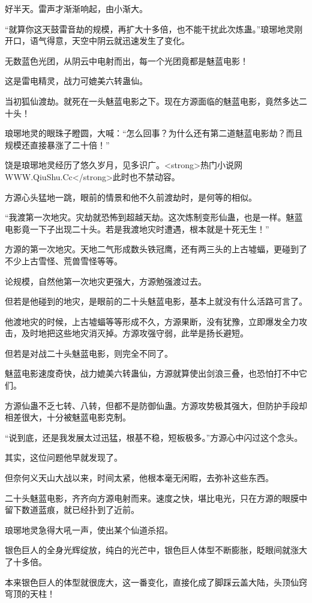 \begin{this_body}
好半天。雷声才渐渐响起，由小渐大。

“就算你这天鼓雷音劫的规模，再扩大十多倍，也不能干扰此次炼蛊。”琅琊地灵刚开口，语气得意，天空中阴云就迅速发生了变化。

无数蓝色光团，从阴云中电射而出，每一个光团竟都是魅蓝电影！

这是雷电精灵，战力可媲美六转蛊仙。

当初狐仙渡劫。就死在一头魅蓝电影之下。现在方源面临的魅蓝电影，竟然多达二十头！

琅琊地灵的眼珠子瞪圆，大喊：“怎么回事？为什么还有第二道魅蓝电影劫？而且规模还直接暴涨了二十倍！”

饶是琅琊地灵经历了悠久岁月，见多识广。<strong>热门小说网WWW.QiuShu.Cc</strong>此时也不禁动容。

方源心头猛地一跳，眼前的情景和他不久前渡劫时，是何等的相似。

“我渡第一次地灾。灾劫就恐怖到超越天劫。这次炼制变形仙蛊，也是一样。魅蓝电影竟一下子出现二十头。若是我渡地灾时遭遇，根本就是十死无生！”

方源的第一次地灾。天地二气形成数头铁冠鹰，还有两三头的上古墟蝠，更碰到了不少上古雪怪、荒兽雪怪等等。

论规模，自然他第一次地灾更强大，方源勉强渡过去。

但若是他碰到的地灾，是眼前的二十头魅蓝电影，基本上就没有什么活路可言了。

他渡地灾的时候，上古墟蝠等等形成不久，方源果断，没有犹豫，立即爆发全力攻击，及时地把这些地灾消灭掉。方源攻强守弱，此举是扬长避短。

但若是对战二十头魅蓝电影，则完全不同了。

魅蓝电影速度奇快，战力媲美六转蛊仙，方源就算使出剑浪三叠，也恐怕打不中它们。

方源仙蛊不乏七转、八转，但都不是防御仙蛊。方源攻势极其强大，但防护手段却相差很大，十分被魅蓝电影克制。

“说到底，还是我发展太过迅猛，根基不稳，短板极多。”方源心中闪过这个念头。

其实，这位问题他早就发现了。

但奈何义天山大战以来，时间太紧，他根本毫无闲暇，去弥补这些东西。

二十头魅蓝电影，齐齐向方源电射而来。速度之快，堪比电光，只在方源的眼膜中留下数道蓝痕，就已经扑到了近前。

琅琊地灵急得大吼一声，使出某个仙道杀招。

银色巨人的全身光辉绽放，纯白的光芒中，银色巨人体型不断膨胀，眨眼间就涨大了十多倍。

本来银色巨人的体型就很庞大，这一番变化，直接化成了脚踩云盖大陆，头顶仙窍穹顶的天柱！


\end{this_body}
